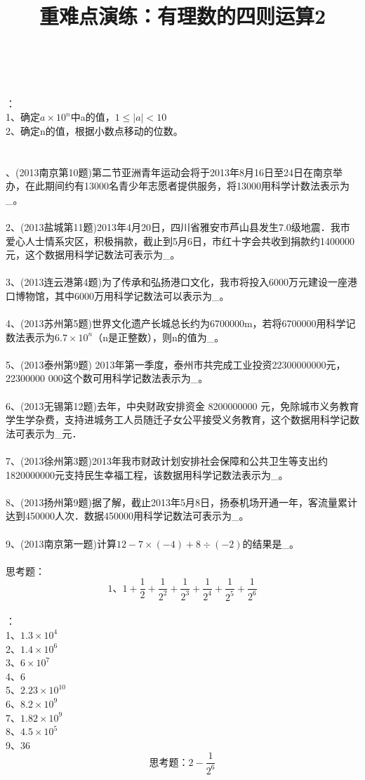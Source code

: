\documentclass[fleqn]{article}
\title{重难点演练：有理数的四则运算2}
\begin{document}
  \hspace{4cm}{\Large 挑战中考之科学记数法}
	\\
	\\

	：\\
	1、确定$a\times10^n$中a的值，$1\leq|a|<10$\\
	2、确定n的值，根据小数点移动的位数。\\
	\\
	\\
	、(2013南京第10题)第二节亚洲青年运动会将于2013年8月16日至24日在南京举办，在此期间约有13000名青少年志愿者提供服务，将13000用科学计数法表示为\_。\\
	\\
	2、(2013盐城第11题)2013年4月20日，四川省雅安市芦山县发生7.0级地震．我市爱心人士情系灾区，积极捐款，截止到5月6日，市红十字会共收到捐款约1400000元，这个数据用科学记数法可表示为\_。\\
	\\
	3、(2013连云港第4题)为了传承和弘扬港口文化，我市将投入6000万元建设一座港口博物馆，其中6000万用科学记数法可以表示为\_。\\
	\\
	4、(2013苏州第5题)世界文化遗产长城总长约为6700000m，若将6700000用科学记数法表示为$6.7×10^n$（n是正整数），则n的值为\_。\\
	\\
	5、(2013泰州第9题) 2013年第一季度，泰州市共完成工业投资22300000000元，22300000 000这个数可用科学记数法表示为\_。\\
	\\
	6、(2013无锡第12题)去年，中央财政安排资金 8200000000 元，免除城市义务教育学生学杂费，支持进城务工人员随迁子女公平接受义务教育，这个数据用科学记数法可表示为\_元．\\
	\\
	7、(2013徐州第3题)2013年我市财政计划安排社会保障和公共卫生等支出约1820000000元支持民生幸福工程，该数据用科学记数法表示为\_。\\
	\\
	8、(2013扬州第9题)据了解，截止2013年5月8日，扬泰机场开通一年，客流量累计达到450000人次．数据450000用科学记数法可表示为\_。\\
	\\
	9、(2013南京第一题)计算$12-7\times(-4)+8\div(-2)$的结果是\_。\\
	\\
	思考题：\\
	\[\text{1、}1+\frac12+\frac1{2^2}+\frac1{2^3}+\frac1{2^4}+\frac1{2^5}+\frac1{2^6}\]
	\\
	\newpage
	：\\
	1、$1.3\times10^4$\\
	2、$1.4\times10^6$\\
	3、$6\times10^7$\\
	4、$6$\\
	5、$2.23\times10^{10}$\\
	6、$8.2\times10^9$\\
	7、$1.82\times10^9$\\
	8、$4.5\times10^5$\\
	9、$36$\\
	\noindent\[\text{思考题：}2-\frac1{2^6}\]
\end{document}
